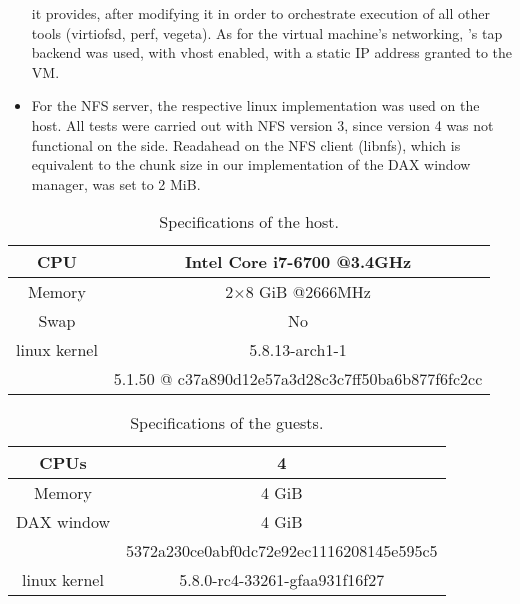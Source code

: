 \begin{itemize}
          it provides, after modifying it in order to orchestrate execution of
          all other tools (virtiofsd, perf, vegeta). As for the virtual
          machine's networking, \qemu{}'s tap backend %
          was used, with vhost enabled, with a static IP address granted to the
          VM.
    \item For the NFS server, the respective linux implementation was used on
          the host. All tests were carried out with NFS version 3, since version
          4 was not functional on the \osv{} side. Readahead on the NFS client
          (libnfs), which is equivalent to the chunk size in our implementation
          of the DAX window manager, was set to 2 MiB.
\end{itemize}

\begin{table}
    \centering
    \begin{tabular}{ |c|c| }
        \hline
        CPU & Intel Core i7-6700 @3.4GHz \\
        \hline
        Memory & 2\(\times\)8 GiB @2666MHz \\
        \hline
        Swap & No \\
        \hline
        linux kernel & 5.8.13-arch1-1 \\
        \hline
        \qemu{} & 5.1.50 @ c37a890d12e57a3d28c3c7ff50ba6b877f6fc2cc \cite{virtiofs:qemu} \\
        \hline
    \end{tabular}
    \caption{Specifications of the host.}
    \label{tab:host-specs}
\end{table}

\begin{table}
    \centering
    \begin{tabular}{ |c|c| }
        \hline
        CPUs & 4 \\
        \hline
        Memory & 4 GiB \\
        \hline
        DAX window & 4 GiB \\
        \hline
        \osv{} & 5372a230ce0abf0dc72e92ec1116208145e595c5 \cite{osv-repo} \\
        \hline
        linux kernel & 5.8.0-rc4-33261-gfaa931f16f27 \cite{virtiofs:linux} \\
        \hline
    \end{tabular}
    \caption{Specifications of the guests.}
    \label{tab:guest-specs}
\end{table}


